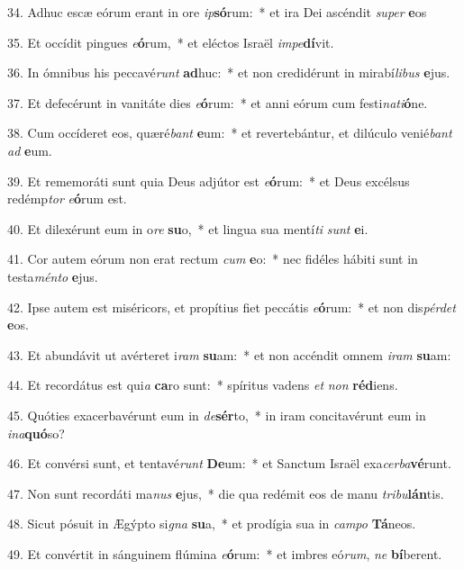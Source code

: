 34. Adhuc escæ eórum erant in ore \textit{ip}\textbf{só}rum:~*  et ira Dei ascéndit \textit{su}\textit{per} \textbf{e}os\

35. Et occídit pingues \textit{e}\textbf{ó}rum,~*  et eléctos Israël \textit{im}\textit{pe}\textbf{dí}vit.\

36. In ómnibus his peccavé\textit{runt} \textbf{ad}huc:~*  et non credidérunt in mirabí\textit{li}\textit{bus} \textbf{e}jus.\

37. Et defecérunt in vanitáte dies \textit{e}\textbf{ó}rum:~*  et anni eórum cum festi\textit{na}\textit{ti}\textbf{ó}ne.\

38. Cum occíderet eos, quæré\textit{bant} \textbf{e}um:~*  et revertebántur, et dilúculo venié\textit{bant} \textit{ad} \textbf{e}um.\

39. Et rememoráti sunt quia Deus adjútor est \textit{e}\textbf{ó}rum:~*  et Deus excélsus redémp\textit{tor} \textit{e}\textbf{ó}rum est.\

40. Et dilexérunt eum in o\textit{re} \textbf{su}o,~*  et lingua sua mentí\textit{ti} \textit{sunt} \textbf{e}i.\

41. Cor autem eórum non erat rectum \textit{cum} \textbf{e}o:~*  nec fidéles hábiti sunt in testa\textit{mén}\textit{to} \textbf{e}jus.\

42. Ipse autem est miséricors, et propítius fiet peccátis \textit{e}\textbf{ó}rum:~*  et non dis\textit{pér}\textit{det} \textbf{e}os.\

43. Et abundávit ut avérteret i\textit{ram} \textbf{su}am:~*  et non accéndit omnem \textit{i}\textit{ram} \textbf{su}am:\

44. Et recordátus est qui\textit{a} \textbf{ca}ro sunt:~*  spíritus vadens \textit{et} \textit{non} \textbf{réd}iens.\

45. Quóties exacerbavérunt eum in \textit{de}\textbf{sér}to,~*  in iram concitavérunt eum in \textit{in}\textit{a}\textbf{quó}so?\

46. Et convérsi sunt, et tentavé\textit{runt} \textbf{De}um:~*  et Sanctum Israël exa\textit{cer}\textit{ba}\textbf{vé}runt.\

47. Non sunt recordáti ma\textit{nus} \textbf{e}jus,~*  die qua redémit eos de manu \textit{tri}\textit{bu}\textbf{lán}tis.\

48. Sicut pósuit in Ægýpto si\textit{gna} \textbf{su}a,~*  et prodígia sua in \textit{cam}\textit{po} \textbf{Tá}neos.\

49. Et convértit in sánguinem flúmina \textit{e}\textbf{ó}rum:~*  et imbres eó\textit{rum}, \textit{ne} \textbf{bí}berent.\

